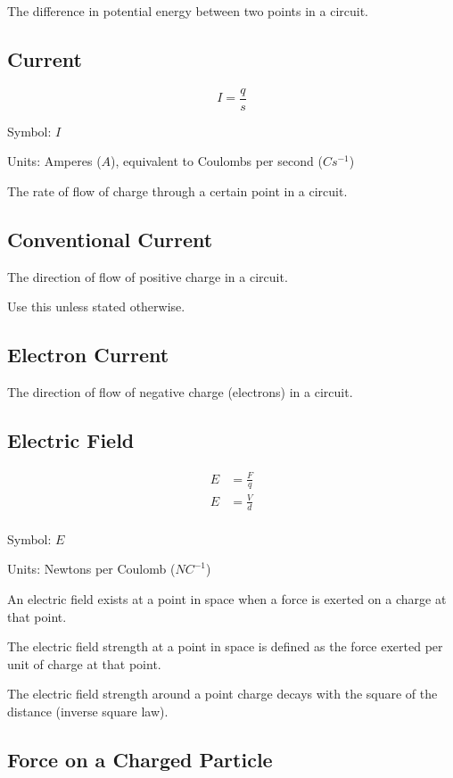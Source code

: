 \documentclass[a4paper,11pt]{article}
\begin{document}
The difference in potential energy between two points in a circuit.


\subsection{Current}

$$
I = \frac{q}{s}
$$

Symbol: $I$

Units: Amperes ($A$), equivalent to Coulombs per second ($Cs^{-1}$)

The rate of flow of charge through a certain point in a circuit.


\subsection{Conventional Current}

The direction of flow of positive charge in a circuit.

Use this unless stated otherwise.


\subsection{Electron Current}

The direction of flow of negative charge (electrons) in a circuit.


\subsection{Electric Field}

$$
\begin{aligned}
E & = \frac{F}{q} \\
E & = \frac{V}{d} \\
\end{aligned}
$$

Symbol: $E$

Units: Newtons per Coulomb ($NC^{-1}$)

An electric field exists at a point in space when a force is exerted on a
charge at that point.

The electric field strength at a point in space is defined as the force exerted
per unit of charge at that point.

The electric field strength around a point charge decays with the square of
the distance (inverse square law).


\subsection{Force on a Charged Particle}
\end{document}
